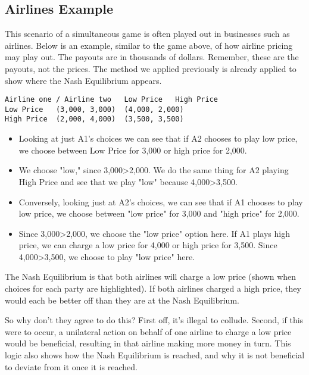 \documentclass[11pt]{article} %
\begin{document}
\subsection{Airlines Example}
This scenario of a simultaneous game is often played out in businesses such as airlines. Below is an example, similar to the game above, of how airline pricing may play out. The payouts are in thousands of dollars. Remember, these are the payouts, not the prices. The method we applied previously is already applied to show where the Nash Equilibrium appears.
\begin{verbatim}
Airline one / Airline two 	Low Price	High Price
Low Price	(3,000, 3,000)	(4,000, 2,000)
High Price	(2,000, 4,000)	(3,500, 3,500)
\end{verbatim}
\begin{itemize}
    \item Looking at just A1's choices we can see that if A2 chooses to play low price, we choose between Low Price for 3,000 or high price for 2,000. 
    \item We choose "low," since 3,000>2,000. We do the same thing for A2 playing High Price and see that we play "low" because 4,000>3,500. 
    \item Conversely, looking just at A2's choices, we can see that if A1 chooses to play low price, we choose between "low price" for 3,000 and "high price" for 2,000. 
    \item Since 3,000>2,000, we choose the "low price" option here. If A1 plays high price, we can charge a low price for 4,000 or high price for 3,500. Since 4,000>3,500, we choose to play "low price" here.
\end{itemize}


The Nash Equilibrium is that both airlines will charge a low price (shown when choices for each party are highlighted). If both airlines charged a high price, they would each be better off than they are at the Nash Equilibrium.

So why don't they agree to do this? First off, it's illegal to collude. Second, if this were to occur, a unilateral action on behalf of one airline to charge a low price would be beneficial, resulting in that airline making more money in turn. This logic also shows how the Nash Equilibrium is reached, and why it is not beneficial to deviate from it once it is reached. 
\end{document}
